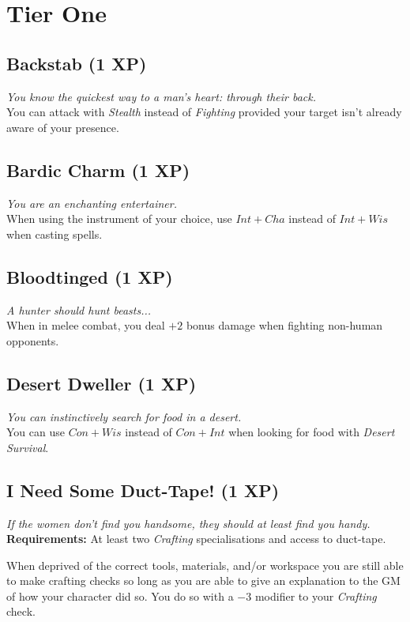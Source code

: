 \section{Tier One}

\subsection*{Backstab (1 XP)}
\textit{You know the quickest way to a man's heart: through their back.}\\
You can attack with \textit{Stealth} instead of \textit{Fighting} provided your target isn't already aware of your presence.

\subsection*{Bardic Charm (1 XP)}
\textit{You are an enchanting entertainer.}\\
When using the instrument of your choice, use $Int+Cha$ instead of $Int+Wis$ when casting spells.

\subsection*{Bloodtinged (1 XP)}
\textit{A hunter should hunt beasts...}\\
When in melee combat, you deal $+2$ bonus damage when fighting non-human opponents.

\subsection*{Desert Dweller (1 XP)}
\textit{You can instinctively search for food in a desert.}\\
You can use $Con + Wis$ instead of $Con + Int$ when looking for food with \textit{Desert Survival}.

\subsection*{I Need Some Duct-Tape! (1 XP)}
\textit{If the women don't find you handsome, they should at least find you handy.}\\
\textbf{Requirements:} At least two \textit{Crafting} specialisations and access to duct-tape.

When deprived of the correct tools, materials, and/or workspace you are still able to make crafting checks so long as you are able to give an explanation to the GM of how your character did so.
You do so with a $-3$ modifier to your \textit{Crafting} check.

